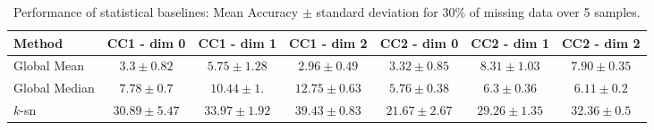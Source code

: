 \begin{table}[htbp]
  \centering
  \scriptsize{
  \begin{tabular}{lcccccc}
    \toprule
    Method   & CC1 - dim 0   & CC1 - dim 1   & CC1 - dim 2   & CC2 - dim 0  & CC2 - dim 1  & CC2 - dim 2 \\
    \midrule
    Global Mean & $3.3 \pm 0.82$ & $5.75\pm 1.28$  &$ 2.96\pm 0.49$  & $3.32 \pm 0.85$ & $8.31 \pm 1.03$  & $7.90\pm 0.35$\\
    Global Median & $7.78 \pm 0.7$   & $10.44 \pm 1.$ &$ 12.75 \pm 0.63 $ & $5.76 \pm 0.38 $&$ 6.3\pm 0.36  $&$ 6.11\pm 0.2$\\
    $k$-sn & $30.89\pm 5.47 $& $33.97 \pm 1.92$ & $39.43 \pm 0.83  $& $21.67 \pm 2.67 $&$ 29.26\pm 1.35$   &$ 32.36 \pm 0.5 $\\
    \bottomrule
  \end{tabular}}
   \vspace{2pt}
  \caption{%
      Performance of statistical baselines: Mean Accuracy $\pm$ standard deviation for $30\%$ of missing data over 5 samples. 
  }\label{table:comparison-SNN}
\end{table}%
